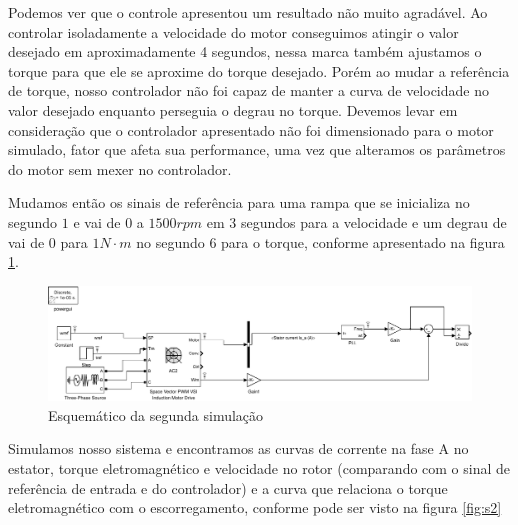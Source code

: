 \documentclass{article}
\begin{document}
Podemos ver que o controle apresentou um resultado não muito agradável. Ao controlar isoladamente a velocidade do motor conseguimos atingir o valor desejado em aproximadamente 4 segundos, nessa marca também ajustamos o torque para que ele se aproxime do torque desejado. Porém ao mudar a referência de torque, nosso controlador não foi capaz de manter a curva de velocidade no valor desejado enquanto perseguia o degrau no torque. Devemos levar em consideração que o controlador apresentado não foi dimensionado para o motor simulado, fator que afeta sua performance, uma vez que alteramos os parâmetros do motor sem mexer no controlador.


Mudamos então os sinais de referência para uma rampa que se inicializa no segundo $1$ e vai de $0$ a $1500 rpm$ em 3 segundos para a velocidade e um degrau de vai de $0$ para $1 N \cdot m$ no segundo 6 para o torque, conforme apresentado na figura \ref{fig:sim2}.

\begin{figure}[H]
	\centering
	\includegraphics[width=\linewidth]{matlab/sim1}
	\caption{Esquemático da segunda simulação}
	\label{fig:sim2}
\end{figure}

Simulamos nosso sistema e encontramos as curvas de corrente na fase A no estator, torque eletromagnético e velocidade no rotor (comparando com o sinal de referência de entrada e do controlador) e a curva que relaciona o torque eletromagnético com o escorregamento, conforme pode ser visto na figura \ref{fig:s2}
\end{document}
